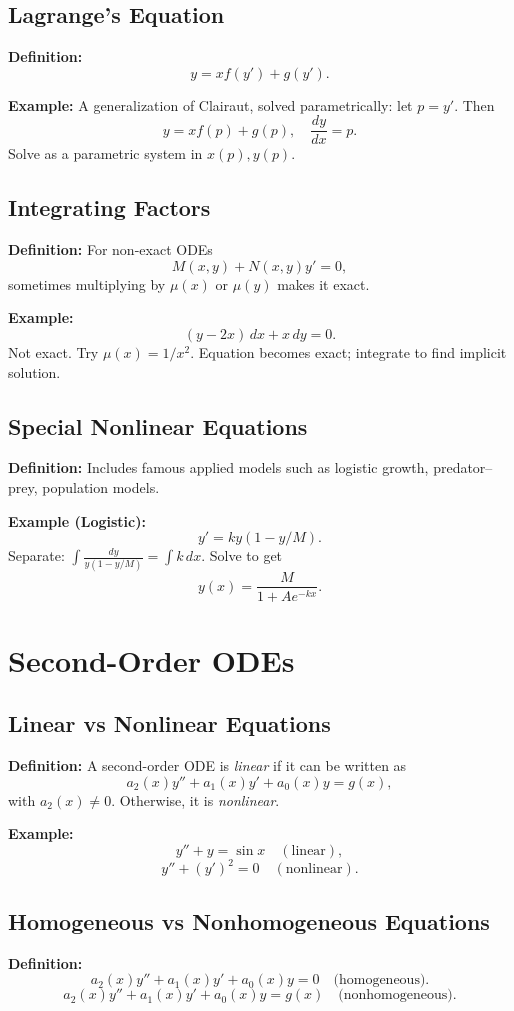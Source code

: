 \documentclass[12pt]{book}
\begin{document}
\chapter{Lagrange’s Equation}
\textbf{Definition:}
\[
y = x f(y') + g(y').
\]

\textbf{Example:}
A generalization of Clairaut, solved parametrically: let \(p = y'\). Then
\[
y = x f(p) + g(p), \quad \frac{dy}{dx} = p.
\]
Solve as a parametric system in \(x(p), y(p)\).

\chapter{Integrating Factors}
\textbf{Definition:} For non-exact ODEs
\[
M(x,y) + N(x,y)y' = 0,
\]
sometimes multiplying by \(\mu(x)\) or \(\mu(y)\) makes it exact.

\textbf{Example:}
\[
(y - 2x)\,dx + x\,dy = 0.
\]
Not exact. Try \(\mu(x) = 1/x^2\).  
Equation becomes exact; integrate to find implicit solution.

\chapter{Special Nonlinear Equations}
\textbf{Definition:} Includes famous applied models such as logistic growth, predator–prey, population models.

\textbf{Example (Logistic):}
\[
y' = ky(1 - y/M).
\]
Separate:
\(\int \frac{dy}{y(1-y/M)} = \int k\,dx.\)  
Solve to get
\[
y(x) = \frac{M}{1 + Ae^{-kx}}.
\]

\part{Second-Order ODEs}

\chapter{Linear vs Nonlinear Equations}
\textbf{Definition:} A second-order ODE is \emph{linear} if it can be written as
\[
a_2(x) y'' + a_1(x) y' + a_0(x) y = g(x),
\]
with $a_2(x)\neq 0$. Otherwise, it is \emph{nonlinear}.

\textbf{Example:}
\[
y'' + y = \sin x \quad (\text{linear}),
\]
\[
y'' + (y')^2 = 0 \quad (\text{nonlinear}).
\]

\chapter{Homogeneous vs Nonhomogeneous Equations}
\textbf{Definition:}
\[
a_2(x)y'' + a_1(x)y' + a_0(x)y = 0 \quad \text{(homogeneous)}.
\]
\[
a_2(x)y'' + a_1(x)y' + a_0(x)y = g(x) \quad \text{(nonhomogeneous)}.
\]
\end{document}
